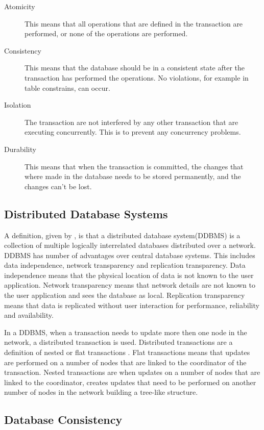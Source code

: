 \begin{description}
	\item[Atomicity] This means that all operations that are defined in the transaction are performed, or none of the operations are performed.
	\item[Consistency] This means that the database should be in a consistent state after the transaction has performed the operations. No violations, for example in table constrains, can occur. 
	\item[Isolation] The transaction are not interfered by any  other transaction that are executing concurrently. This is to prevent any concurrency problems.
	\item[Durability] This means that when the transaction is committed, the changes that where made in the database needs to be stored permanently, and the changes can't be lost. 
\end{description}


\subsection{Distributed Database Systems} %
\label{sec:distributed_database_systems}

A definition, given by \cite{prins99}, is that a distributed database system(DDBMS) is a collection of multiple logically interrelated databases distributed over a network. DDBMS has number of advantages over central database systems. This includes data independence, network transparency and replication transparency. Data independence means that the physical location of data is not known to the user application. Network transparency means that network details are not known to the user application and sees the database as local. Replication transparency means that data is replicated without user interaction for performance, reliability and availability.

In a DDBMS, when a transaction needs to update more then one node in the network, a distributed transaction is used. Distributed transactions are a definition of nested or flat transactions \cite[]{Coulouris2005dsc}. Flat transactions means that updates are performed on a number of nodes that are linked to the coordinator of the transaction. Nested transactions are when updates on a number of nodes that are linked to the coordinator, creates updates that need to be performed on another number of nodes in the network building a tree-like structure. 

\subsection{Database Consistency} %
\label{sub:consistency}

